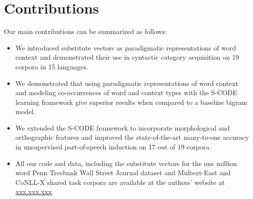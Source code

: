 \section{Contributions}
\label{sec:contrib}

Our main contributions can be summarized as follows:
\begin{itemize}
\item We introduced substitute vectors as paradigmatic representations
  of word context and demonstrated their use in syntactic category
  acquisition on 19 corpora in 15 languages.
\item We demonstrated that using paradigmatic representations of word
  context and modeling co-occurrences of word and context types with
  the S-CODE learning framework give superior results when compared to
  a baseline bigram model.
\item We extended the S-CODE framework to incorporate morphological
  and orthographic features and improved the state-of-the-art
  many-to-one accuracy in unsupervised part-of-speech induction on 17
  out of 19 corpora.
\item All our code and data, including the substitute vectors for the
  one million word Penn Treebank Wall Street Journal dataset and
  Multext-East and CoNLL-X shared task corpora are available at the
  authors' website at \mbox{\url{xxx.xxx.xxx}}.
\end{itemize}

